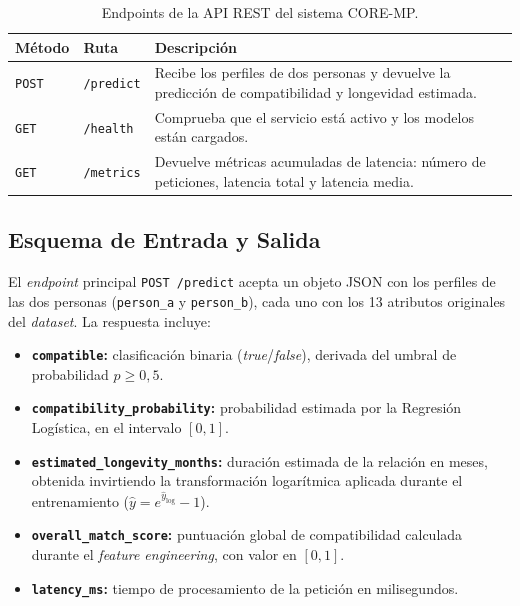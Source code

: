 \begin{table}[H]
\centering
\footnotesize
\begin{tabular}{llp{8.5cm}}
\hline
\textbf{Método} & \textbf{Ruta} & \textbf{Descripción} \\ \hline
\texttt{POST} & \texttt{/predict}  & Recibe los perfiles de dos personas y devuelve la predicción de compatibilidad y longevidad estimada. \\
\texttt{GET}  & \texttt{/health}   & Comprueba que el servicio está activo y los modelos están cargados. \\
\texttt{GET}  & \texttt{/metrics}  & Devuelve métricas acumuladas de latencia: número de peticiones, latencia total y latencia media. \\ \hline
\end{tabular}
\caption{Endpoints de la API REST del sistema CORE-MP.}
\label{tab:endpoints_api}
\end{table}

\subsection{Esquema de Entrada y Salida}
\label{subsec:esquema_api}

El \textit{endpoint} principal \texttt{POST /predict} acepta un objeto JSON con los perfiles de las dos personas (\texttt{person\_a} y \texttt{person\_b}), cada uno con los 13 atributos originales del \textit{dataset}. La respuesta incluye:

\begin{itemize}
    \item \textbf{\texttt{compatible}:} clasificación binaria (\textit{true}/\textit{false}), derivada del umbral de probabilidad $p \geq 0{,}5$.
    \item \textbf{\texttt{compatibility\_probability}:} probabilidad estimada por la Regresión Logística, en el intervalo $[0, 1]$.
    \item \textbf{\texttt{estimated\_longevity\_months}:} duración estimada de la relación en meses, obtenida invirtiendo la transformación logarítmica aplicada durante el entrenamiento ($\hat{y} = e^{\hat{y}_{\log}} - 1$).
    \item \textbf{\texttt{overall\_match\_score}:} puntuación global de compatibilidad calculada durante el \textit{feature engineering}, con valor en $[0, 1]$.
    \item \textbf{\texttt{latency\_ms}:} tiempo de procesamiento de la petición en milisegundos.
\end{itemize}

